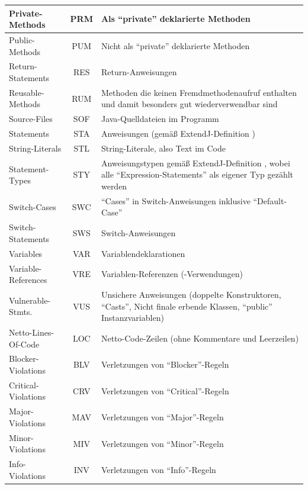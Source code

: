 \documentclass[da,ngerman]{stthesis}
\begin{document}
\begin{itemize}
\begin{center}
\begin{longtabu}{|p{0.23\textwidth}|c|p{0.63\textwidth}|}
    					\hline
    					Private-Methods & PRM & Als "`private"' deklarierte Methoden\\
    					\hline
    					Public-Methods & PUM & Nicht als "`private"' deklarierte Methoden\\
    					\hline
    					Return-Statements & RES & Return-Anweisungen\\
    					\hline
    					Reusable-Methods & RUM & Methoden die keinen Fremdmethodenaufruf enthalten und damit besonders gut wiederverwendbar sind\\
    					\hline
    					Source-Files & SOF & Java-Quelldateien im Programm\\
    					\hline
    					Statements & STA & Anweisungen (gemäß ExtendJ-Definition \cite{ExtendJDoku})\\
    					\hline
    					String-Literals & STL & String-Literale, also Text im Code\\
    					\hline
    					Statement-Types & STY & Anweisungstypen gemäß ExtendJ-Definition \cite{ExtendJDoku}, wobei alle "`Expression-Statements"' als eigener Typ gezählt werden\\
    					\hline
    					Switch-Cases & SWC & "`Cases"' in Switch-Anweisungen inklusive "`Default-Case"'\\
    					\hline
    					Switch-Statements & SWS & Switch-Anweisungen\\
    					\hline
    					Variables & VAR & Variablendeklarationen\\
    					\hline
    					Variable-References & VRE & Variablen-Referenzen (-Verwendungen)\\
    					\hline
    					Vulnerable-Stmts. & VUS & Unsichere Anweisungen (doppelte Konstruktoren, "`Casts"', Nicht finale erbende Klassen, "`public"' Instanzvariablen)\\
    					\hline
    					Netto-Lines-Of-Code & LOC & Netto-Code-Zeilen (ohne Kommentare und Leerzeilen)\\
    					\hline
    					Blocker-Violations & BLV & Verletzungen von "`Blocker"'-Regeln\\
    					\hline
    					Critical-Violations & CRV & Verletzungen von "`Critical"'-Regeln\\
    					\hline
    					Major-Violations & MAV & Verletzungen von "`Major"'-Regeln\\
    					\hline
    					Minor-Violations & MIV & Verletzungen von "`Minor"'-Regeln\\
    					\hline
    					Info-Violations & INV & Verletzungen von "`Info"'-Regeln\\

\end{longtabu}
\end{center}
\end{itemize}
\end{document}
